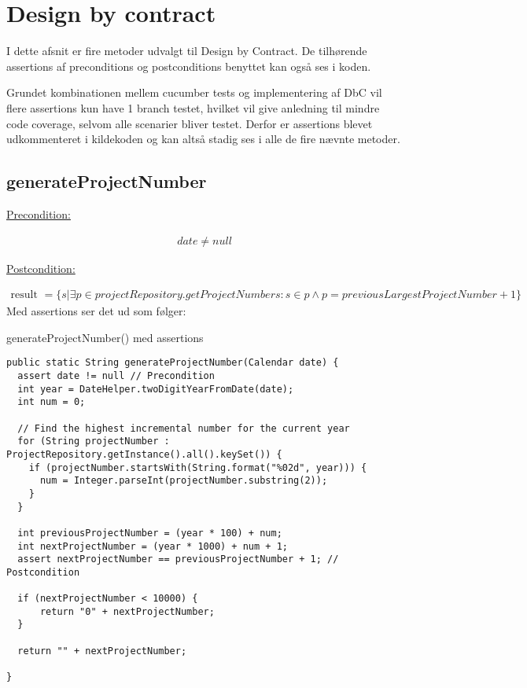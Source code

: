 \section{Design by contract}\label{chap:design_by_contract}

I dette afsnit er fire metoder udvalgt til Design by Contract. De tilhørende assertions af preconditions og postconditions benyttet kan også ses i koden. 

Grundet kombinationen mellem cucumber tests og implementering af DbC vil flere assertions kun have 1 branch testet, hvilket vil give anledning til mindre code coverage, selvom alle scenarier bliver testet. Derfor er assertions blevet udkommenteret i kildekoden og kan altså stadig ses i alle de fire nævnte metoder.

\subsection{generateProjectNumber} \label{sec:contract_generate_project_number}
\underline{Precondition:}
\vspace{4pt}

\begin{align}
    date \neq null
\end{align}
\vspace{4pt}

\noindent
\underline{Postcondition:}
\vspace{4pt}

\begin{align}
    \text{result } = \{s|\exists p \in projectRepository.getProjectNumbers : s \in p \land p = previousLargestProjectNumber + 1\}
\end{align}
\newline
\noindent
Med assertions ser det ud som følger:

\begin{listing}[H]
    \centering
    \caption{generateProjectNumber() med assertions}\label{lst:cgenerate_project_number_assertions}
    \begin{verbatim}
public static String generateProjectNumber(Calendar date) {
  assert date != null // Precondition
  int year = DateHelper.twoDigitYearFromDate(date);
  int num = 0;

  // Find the highest incremental number for the current year
  for (String projectNumber : ProjectRepository.getInstance().all().keySet()) {
    if (projectNumber.startsWith(String.format("%02d", year))) {
      num = Integer.parseInt(projectNumber.substring(2));
    }
  }

  int previousProjectNumber = (year * 100) + num;
  int nextProjectNumber = (year * 1000) + num + 1;
  assert nextProjectNumber == previousProjectNumber + 1; // Postcondition
  
  if (nextProjectNumber < 10000) {
      return "0" + nextProjectNumber;
  }

  return "" + nextProjectNumber;

}
    \end{verbatim}
\end{listing}
